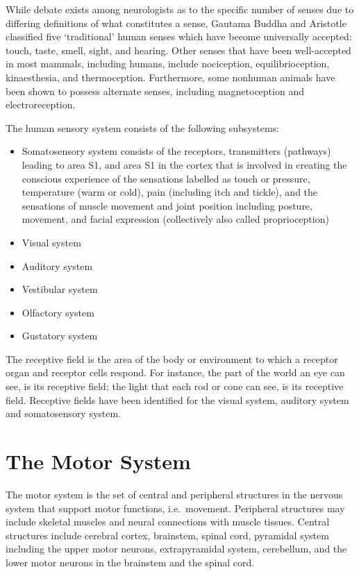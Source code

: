 While debate exists among neurologists as to the specific number of senses due to differing definitions of what constitutes a sense, Gautama Buddha and Aristotle classified five `traditional' human senses which have become universally accepted: touch, taste, smell, sight, and hearing. Other senses that have been well-accepted in most mammals, including humans, include nociception, equilibrioception, kinaesthesia, and thermoception. Furthermore, some nonhuman animals have been shown to possess alternate senses, including magnetoception and electroreception.

The human sensory system consists of the following subsystems:

\begin{itemize}
\tightlist
\item
  Somatosensory system consists of the receptors, transmitters (pathways) leading to area S1, and area S1 in the cortex that is involved in creating the conscious experience of the sensations labelled as touch or pressure, temperature (warm or cold), pain (including itch and tickle), and the sensations of muscle movement and joint position including posture, movement, and facial expression (collectively also called proprioception)
\item
  Visual system
\item
  Auditory system
\item
  Vestibular system
\item
  Olfactory system
\item
  Gustatory system
\end{itemize}

The receptive field is the area of the body or environment to which a receptor organ and receptor cells respond. For instance, the part of the world an eye can see, is its receptive field; the light that each rod or cone can see, is its receptive field. Receptive fields have been identified for the visual system, auditory system and somatosensory system.

\hypertarget{the-motor-system}{%
\section{The Motor System}\label{the-motor-system}}

The motor system is the set of central and peripheral structures in the nervous system that support motor functions, i.e.~movement. Peripheral structures may include skeletal muscles and neural connections with muscle tissues. Central structures include cerebral cortex, brainstem, spinal cord, pyramidal system including the upper motor neurons, extrapyramidal system, cerebellum, and the lower motor neurons in the brainstem and the spinal cord.

